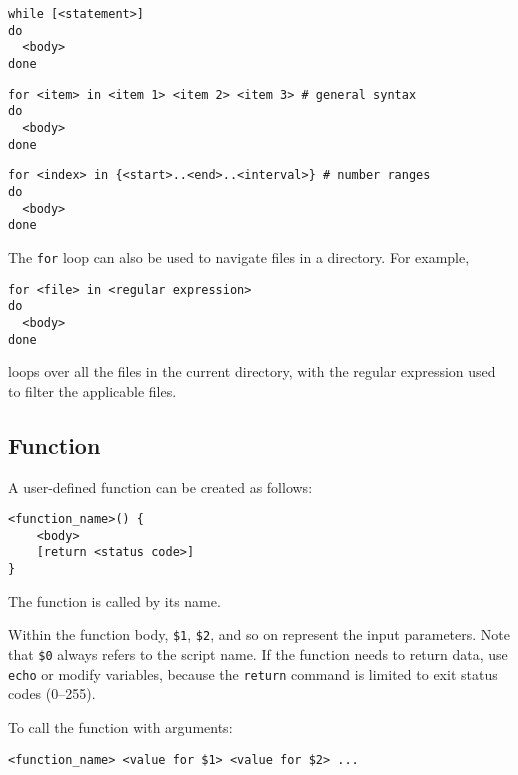 \begin{lstlisting}
while [<statement>]
do
  <body>
done
\end{lstlisting}

\begin{lstlisting}
for <item> in <item 1> <item 2> <item 3> # general syntax
do
  <body>
done
\end{lstlisting}

\begin{lstlisting}
for <index> in {<start>..<end>..<interval>} # number ranges
do
  <body>
done
\end{lstlisting}

The \verb|for| loop can also be used to navigate files in a directory. For example,
\begin{lstlisting}
for <file> in <regular expression>
do
  <body>
done
\end{lstlisting}
loops over all the files in the current directory, with the regular expression used to filter the applicable files.

\subsection{Function}

A user-defined function can be created as follows:
\begin{lstlisting}
<function_name>() {
    <body>
    [return <status code>]
}
\end{lstlisting}

The function is called by its name.

Within the function body, \verb|$1|, \verb|$2|, and so on represent the input parameters. Note that \verb|$0| always refers to the script name. If the function needs to return data, use \verb|echo| or modify variables, because the \verb|return| command is limited to exit status codes (0–255).

To call the function with arguments:
\begin{lstlisting}
<function_name> <value for $1> <value for $2> ...
\end{lstlisting}













